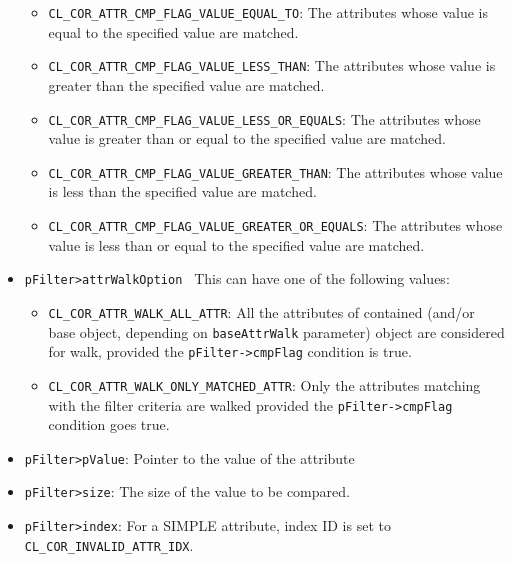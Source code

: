 \begin{flushleft}
\begin{Desc}
\begin{itemize}
		\begin{itemize}
		
	\item
     {\tt{CL\_\-COR\_\-ATTR\_\-CMP\_\-FLAG\_\-VALUE\_\-EQUAL\_\-TO}}: The attributes whose value is equal to the specified value are matched.
     \item
      {\tt{CL\_\-COR\_\-ATTR\_\-CMP\_\-FLAG\_\-VALUE\_\-LESS\_\-THAN}}: The attributes whose value is greater than the specified value are matched.
      \item
      {\tt{CL\_\-COR\_\-ATTR\_\-CMP\_\-FLAG\_\-VALUE\_\-LESS\_\-OR\_\-EQUALS}}:
          The attributes whose value is greater than or equal to the specified value are matched.
          \item
      {\tt{CL\_\-COR\_\-ATTR\_\-CMP\_\-FLAG\_\-VALUE\_\-GREATER\_\-THAN}}:
          The attributes whose value is less than the specified value are matched.
          \item
      {\tt{CL\_\-COR\_\-ATTR\_\-CMP\_\-FLAG\_\-VALUE\_\-GREATER\_\-OR\_\-EQUALS}}:
          The attributes whose value is less than or equal to the specified value are matched.
          \end{itemize}
	\item
	{\tt{pFilter>attrWalkOption} }
			This can have one of the following values:
			\begin{itemize}
					
	\item
			{\tt{CL\_\-COR\_\-ATTR\_\-WALK\_\-ALL\_\-ATTR}}: All the attributes of contained (and/or base object, depending on 
			{\tt{baseAttrWalk}} parameter) object are considered for walk, provided the {\tt{pFilter->cmpFlag}}  condition is true.
\item
                 	{\tt{CL\_\-COR\_\-ATTR\_\-WALK\_\-ONLY\_\-MATCHED\_\-ATTR}}: Only the attributes matching with the filter criteria are walked 
                 	provided the {\tt{pFilter->cmpFlag}} condition goes true.
                 	 \end{itemize}
                 	
           	\item
           	{\tt{pFilter>pValue}}:
Pointer to the value of the attribute
           	\item{\tt{pFilter>size}}: 
The size of the value to be compared.
\item
	           	{\tt{pFilter>index}}:
For a SIMPLE attribute, index ID is set to {\tt{CL\_\-COR\_\-INVALID\_\-ATTR\_\-IDX}}.
          \end{itemize}



\end{Desc}
\end{flushleft}
